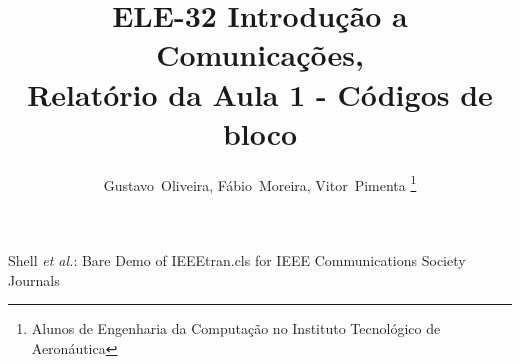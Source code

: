 \documentclass[journal,comsoc]{IEEEtran}
\begin{document}
    \title{ELE-32 Introdução a Comunicações, \\Relatório da Aula 1 - Códigos de bloco}
    
    \author{Gustavo~Oliveira, Fábio~Moreira, Vitor~Pimenta%
    \thanks{Alunos de Engenharia da Computação no Instituto Tecnológico de Aeronáutica}}%
    
    
    
    
    {Shell \MakeLowercase{\textit{et al.}}: Bare Demo of IEEEtran.cls for IEEE Communications Society Journals}
    
\end{document}
